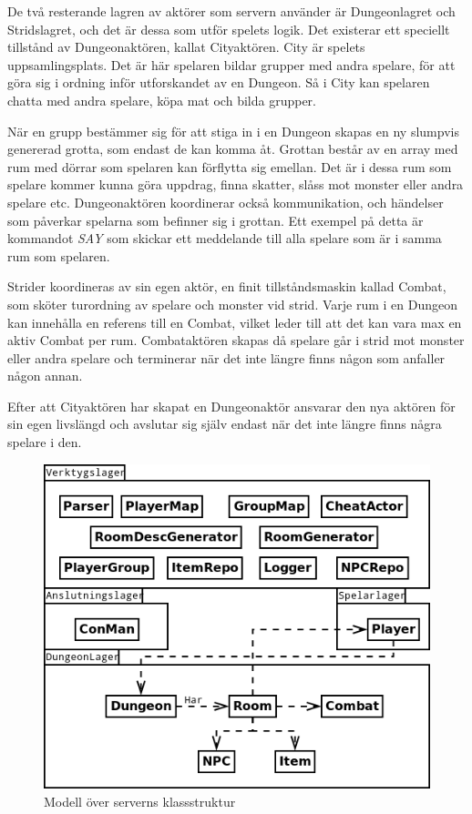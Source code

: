 \documentclass[a4paper]{article}
\begin{document}
De två resterande lagren av aktörer som servern använder är Dungeonlagret och Stridslagret, och det är dessa som utför spelets logik. Det existerar ett speciellt tillstånd av Dungeonaktören, kallat Cityaktören. City är spelets uppsamlingsplats. Det är här spelaren bildar grupper med andra spelare, för att göra sig i ordning inför utforskandet av en Dungeon. Så i City kan spelaren chatta med andra spelare, köpa mat och bilda grupper.

När en grupp bestämmer sig för att stiga in i en Dungeon skapas en ny slumpvis genererad grotta, som endast de kan komma åt. Grottan består av en array med rum med dörrar som spelaren kan förflytta sig emellan. Det är i dessa rum som spelare kommer kunna göra uppdrag, finna skatter, slåss mot monster eller andra spelare etc. Dungeonaktören koordinerar också kommunikation, och händelser som påverkar spelarna som befinner sig i grottan. Ett exempel på detta är kommandot \textit{SAY} som skickar ett meddelande till alla spelare som är i samma rum som spelaren. 

Strider koordineras av sin egen aktör, en finit tillståndsmaskin kallad Combat, som sköter turordning av spelare och monster vid strid. Varje rum i en Dungeon kan innehålla en referens till en Combat, vilket leder till att det kan vara max en aktiv Combat per rum. Combataktören skapas då spelare går i strid mot monster eller andra spelare och terminerar när det inte längre finns någon som anfaller någon annan. 

Efter att Cityaktören har skapat en Dungeonaktör ansvarar den nya aktören för sin egen livslängd och avslutar sig själv endast när det inte längre finns några spelare i den.

\begin{figure}[hbt]
\centering
\includegraphics[width=1.0\textwidth]{serverUml2}
\caption{\label{fig:ServerKlassModell}Modell över serverns klassstruktur}
\end{figure}
\end{document}
